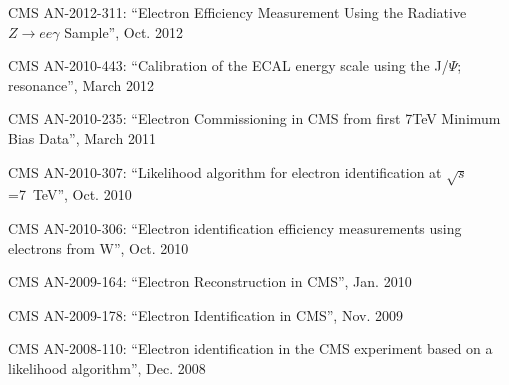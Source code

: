 CMS AN-2012-311: ``Electron Efficiency Measurement Using the Radiative $Z\to ee\gamma$ Sample'', Oct. 2012

CMS AN-2010-443: ``Calibration of the ECAL energy scale using the J/$\Psi$; resonance'', March 2012

CMS AN-2010-235: ``Electron Commissioning in CMS from first 7TeV Minimum Bias Data'', March 2011

CMS AN-2010-307: ``Likelihood algorithm for electron identification at $\sqrt{s}$=7~TeV'', Oct. 2010

CMS AN-2010-306: ``Electron identification efficiency measurements using electrons from W'', Oct. 2010

CMS AN-2009-164: ``Electron Reconstruction in CMS'', Jan. 2010

CMS AN-2009-178: ``Electron Identification in CMS'', Nov. 2009

CMS AN-2008-110: ``Electron identification in the CMS experiment based on a likelihood algorithm'', Dec. 2008
